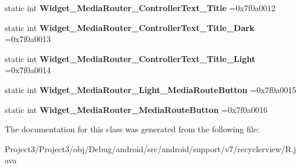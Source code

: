 \begin{DoxyCompactItemize}
\item 
\mbox{\label{classandroid_1_1support_1_1v7_1_1recyclerview_1_1R_1_1style_ab0d9ada6171bed7bb0102515514a4604}} 
static int {\bfseries Widget\+\_\+\+Media\+Router\+\_\+\+Controller\+Text\+\_\+\+Title} =0x7f0a0012
\item 
\mbox{\label{classandroid_1_1support_1_1v7_1_1recyclerview_1_1R_1_1style_acd56e955cd7a494c5e92d3c658261016}} 
static int {\bfseries Widget\+\_\+\+Media\+Router\+\_\+\+Controller\+Text\+\_\+\+Title\+\_\+\+Dark} =0x7f0a0013
\item 
\mbox{\label{classandroid_1_1support_1_1v7_1_1recyclerview_1_1R_1_1style_a65c5cdc30408970d7110e9c29de71948}} 
static int {\bfseries Widget\+\_\+\+Media\+Router\+\_\+\+Controller\+Text\+\_\+\+Title\+\_\+\+Light} =0x7f0a0014
\item 
\mbox{\label{classandroid_1_1support_1_1v7_1_1recyclerview_1_1R_1_1style_a22fefb2e28a12b5e858aec26f9eeed2c}} 
static int {\bfseries Widget\+\_\+\+Media\+Router\+\_\+\+Light\+\_\+\+Media\+Route\+Button} =0x7f0a0015
\item 
\mbox{\label{classandroid_1_1support_1_1v7_1_1recyclerview_1_1R_1_1style_a9e1e72a19287945d79df815e89207e17}} 
static int {\bfseries Widget\+\_\+\+Media\+Router\+\_\+\+Media\+Route\+Button} =0x7f0a0016
\end{DoxyCompactItemize}


The documentation for this class was generated from the following file\+:\begin{DoxyCompactItemize}
\item 
Project3/\+Project3/obj/\+Debug/android/src/android/support/v7/recyclerview/R.\+java\end{DoxyCompactItemize}
